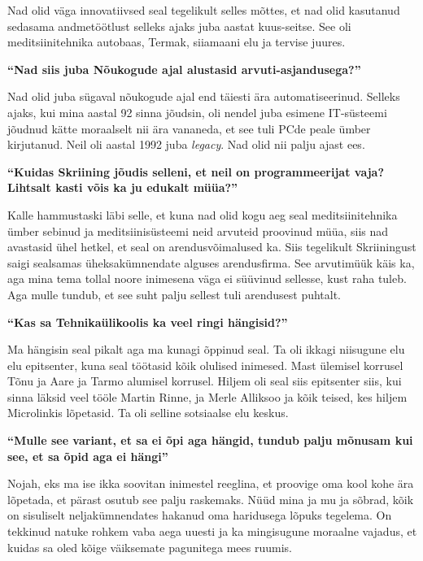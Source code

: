 Nad olid väga innovatiivsed seal tegelikult selles mõttes, et nad olid 
kasutanud sedasama andmetöötlust selleks ajaks juba aastat kuus-seitse. See oli 
 meditsiinitehnika autobaas, Termak, siiamaani elu ja tervise 
juures. 


\textbf{\enquote{Nad siis juba Nõukogude ajal alustasid arvuti-asjandusega?}}

Nad olid juba sügaval nõukogude ajal end täiesti ära automatiseerinud. Selleks 
ajaks, kui mina aastal 92 sinna jõudsin, oli nendel juba esimene IT-süsteemi 
jõudnud kätte moraalselt nii ära vananeda, et see tuli PCde peale ümber 
kirjutanud. Neil oli aastal 1992 juba \emph{legacy}. Nad olid nii palju ajast 
ees.


\textbf{\enquote{Kuidas Skriining jõudis selleni, et neil on programmeerijat 
vaja? Lihtsalt kasti võis ka ju edukalt müüa?}}

Kalle hammustaski läbi selle, et kuna nad olid kogu 
aeg seal meditsiinitehnika ümber sebinud ja meditsiinisüsteemi neid arvuteid 
proovinud müüa, siis nad avastasid ühel hetkel, et seal on arendusvõimalused 
ka. Siis tegelikult Skriiningust saigi sealsamas 
üheksakümnendate alguses  arendusfirma. See arvutimüük käis ka, aga mina tema 
tollal noore inimesena väga ei süüvinud sellesse, kust raha tuleb. Aga mulle 
tundub, et see suht palju sellest tuli arendusest puhtalt.


\textbf{\enquote{Kas sa Tehnikaülikoolis ka veel ringi hängisid?}}

Ma hängisin seal pikalt aga ma kunagi õppinud seal. Ta oli ikkagi niisugune elu 
elu epitsenter, kuna seal töötasid kõik olulised inimesed. 
Mast ülemisel korrusel Tõnu ja 
Aare ja Tarmo alumisel 
korrusel. Hiljem oli seal siis epitsenter siis, kui sinna läksid veel tööle 
Martin Rinne, ja Merle Alliksoo ja kõik teised, kes hiljem Microlinkis lõpetasid. Ta 
oli selline  sotsiaalse elu keskus. 

\textbf{\enquote{Mulle see variant, et sa ei õpi aga hängid, tundub palju 
mõnusam kui see, et sa õpid aga ei hängi}}

Nojah, eks ma ise ikka soovitan inimestel reeglina, et  proovige oma kool kohe 
ära lõpetada, et pärast osutub see palju raskemaks. Nüüd mina ja mu ja sõbrad, 
kõik on sisuliselt neljakümnendates hakanud oma haridusega lõpuks tegelema. On 
tekkinud natuke rohkem vaba aega uuesti ja ka mingisugune moraalne vajadus, et 
kuidas sa oled kõige väiksemate pagunitega mees ruumis.


